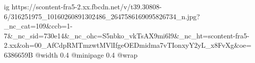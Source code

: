  
 
 
 
 

\ifcmt
  ig https://scontent-fra5-2.xx.fbcdn.net/v/t39.30808-6/316251975_10160260891302486_2647586169095826734_n.jpg?_nc_cat=109&ccb=1-7&_nc_sid=730e14&_nc_ohc=S5nbko_vkTsAX9mi6l9&_nc_ht=scontent-fra5-2.xx&oh=00_AfCdpRMTmzwtMVlIfgeOEDmidma7vTIonxyY2yL_x8FvXg&oe=6386659B
  @width 0.4
  @minipage 0.4
  @wrap \parpic[r]
\fi
